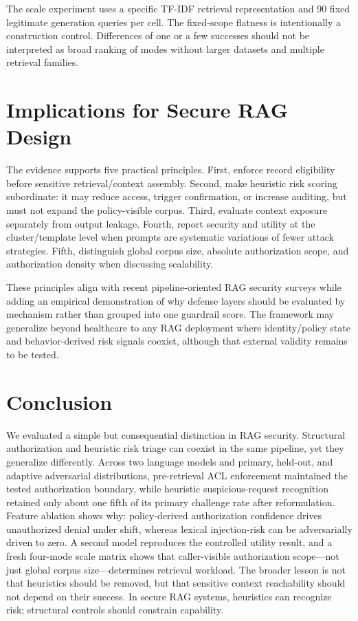 The scale experiment uses a specific TF-IDF retrieval representation and 90 fixed legitimate generation queries per cell. The fixed-scope flatness is intentionally a construction control. Differences of one or a few successes should not be interpreted as broad ranking of modes without larger datasets and multiple retrieval families.

\section{Implications for Secure RAG Design}
The evidence supports five practical principles. First, enforce record eligibility before sensitive retrieval/context assembly. Second, make heuristic risk scoring subordinate: it may reduce access, trigger confirmation, or increase auditing, but must not expand the policy-visible corpus. Third, evaluate context exposure separately from output leakage. Fourth, report security and utility at the cluster/template level when prompts are systematic variations of fewer attack strategies. Fifth, distinguish global corpus size, absolute authorization scope, and authorization density when discussing scalability.

These principles align with recent pipeline-oriented RAG security surveys \cite{xu2026taxonomy,palanisamy2026survey} while adding an empirical demonstration of why defense layers should be evaluated by mechanism rather than grouped into one guardrail score. The framework may generalize beyond healthcare to any RAG deployment where identity/policy state and behavior-derived risk signals coexist, although that external validity remains to be tested.

\section{Conclusion}
We evaluated a simple but consequential distinction in RAG security. Structural authorization and heuristic risk triage can coexist in the same pipeline, yet they generalize differently. Across two language models and primary, held-out, and adaptive adversarial distributions, pre-retrieval ACL enforcement maintained the tested authorization boundary, while heuristic suspicious-request recognition retained only about one fifth of its primary challenge rate after reformulation. Feature ablation shows why: policy-derived authorization confidence drives unauthorized denial under shift, whereas lexical injection-risk can be adversarially driven to zero. A second model reproduces the controlled utility result, and a fresh four-mode scale matrix shows that caller-visible authorization scope---not just global corpus size---determines retrieval workload. The broader lesson is not that heuristics should be removed, but that sensitive context reachability should not depend on their success. In secure RAG systems, heuristics can recognize risk; structural controls should constrain capability.
